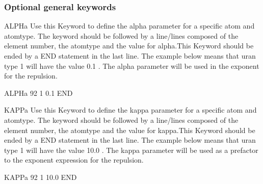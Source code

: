 \subsubsection{Optional general keywords}
\begin{keywordlist}
\item[ALPHa]
Use this Keyword to define the alpha parameter for a specific atom and atomtype.
The keyword should be followed by a line/lines composed of the element number,
the atomtype and the value for alpha.This Keyword should be ended by a END statement
in the last line. The example below means that uran type 1 will have the value 0.1 .
The alpha parameter will be used in the exponent for the repulsion.
\begin{inputlisting}
ALPHa
92 1 0.1
END
\end{inputlisting}
\item[KAPPa]
Use this Keyword to define the kappa parameter for a specific atom and atomtype.
The keyword should be followed by a line/lines composed of the element number,
the atomtype and the value for kappa.This Keyword should be ended by a END statement
in the last line. The example below means that uran type 1 will have the value 10.0 .
The kappa parameter will be used as a prefactor to the exponent expression for the repulsion.
\begin{inputlisting}
KAPPa
92 1 10.0
END
\end{inputlisting}

\end{keywordlist}
